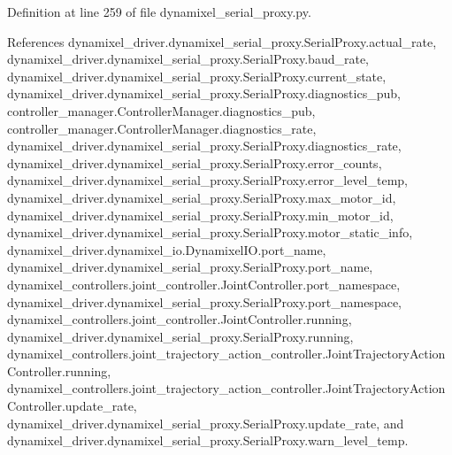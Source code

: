 Definition at line 259 of file dynamixel\+\_\+serial\+\_\+proxy.\+py.



References dynamixel\+\_\+driver.\+dynamixel\+\_\+serial\+\_\+proxy.\+Serial\+Proxy.\+actual\+\_\+rate, dynamixel\+\_\+driver.\+dynamixel\+\_\+serial\+\_\+proxy.\+Serial\+Proxy.\+baud\+\_\+rate, dynamixel\+\_\+driver.\+dynamixel\+\_\+serial\+\_\+proxy.\+Serial\+Proxy.\+current\+\_\+state, dynamixel\+\_\+driver.\+dynamixel\+\_\+serial\+\_\+proxy.\+Serial\+Proxy.\+diagnostics\+\_\+pub, controller\+\_\+manager.\+Controller\+Manager.\+diagnostics\+\_\+pub, controller\+\_\+manager.\+Controller\+Manager.\+diagnostics\+\_\+rate, dynamixel\+\_\+driver.\+dynamixel\+\_\+serial\+\_\+proxy.\+Serial\+Proxy.\+diagnostics\+\_\+rate, dynamixel\+\_\+driver.\+dynamixel\+\_\+serial\+\_\+proxy.\+Serial\+Proxy.\+error\+\_\+counts, dynamixel\+\_\+driver.\+dynamixel\+\_\+serial\+\_\+proxy.\+Serial\+Proxy.\+error\+\_\+level\+\_\+temp, dynamixel\+\_\+driver.\+dynamixel\+\_\+serial\+\_\+proxy.\+Serial\+Proxy.\+max\+\_\+motor\+\_\+id, dynamixel\+\_\+driver.\+dynamixel\+\_\+serial\+\_\+proxy.\+Serial\+Proxy.\+min\+\_\+motor\+\_\+id, dynamixel\+\_\+driver.\+dynamixel\+\_\+serial\+\_\+proxy.\+Serial\+Proxy.\+motor\+\_\+static\+\_\+info, dynamixel\+\_\+driver.\+dynamixel\+\_\+io.\+Dynamixel\+I\+O.\+port\+\_\+name, dynamixel\+\_\+driver.\+dynamixel\+\_\+serial\+\_\+proxy.\+Serial\+Proxy.\+port\+\_\+name, dynamixel\+\_\+controllers.\+joint\+\_\+controller.\+Joint\+Controller.\+port\+\_\+namespace, dynamixel\+\_\+driver.\+dynamixel\+\_\+serial\+\_\+proxy.\+Serial\+Proxy.\+port\+\_\+namespace, dynamixel\+\_\+controllers.\+joint\+\_\+controller.\+Joint\+Controller.\+running, dynamixel\+\_\+driver.\+dynamixel\+\_\+serial\+\_\+proxy.\+Serial\+Proxy.\+running, dynamixel\+\_\+controllers.\+joint\+\_\+trajectory\+\_\+action\+\_\+controller.\+Joint\+Trajectory\+Action\+Controller.\+running, dynamixel\+\_\+controllers.\+joint\+\_\+trajectory\+\_\+action\+\_\+controller.\+Joint\+Trajectory\+Action\+Controller.\+update\+\_\+rate, dynamixel\+\_\+driver.\+dynamixel\+\_\+serial\+\_\+proxy.\+Serial\+Proxy.\+update\+\_\+rate, and dynamixel\+\_\+driver.\+dynamixel\+\_\+serial\+\_\+proxy.\+Serial\+Proxy.\+warn\+\_\+level\+\_\+temp.


